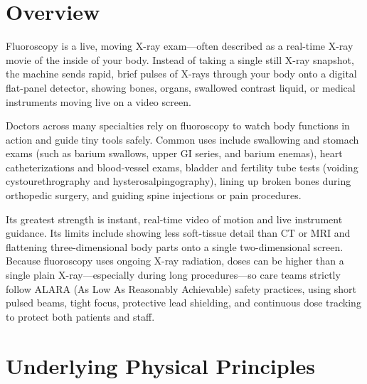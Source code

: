 \label{ch:infographic-fluroscopy}

\section{Overview}

Fluoroscopy is a live, moving X-ray exam---often described as a real-time X-ray movie of the inside of your body. Instead of taking a single still X-ray snapshot, the machine sends rapid, brief pulses of X-rays through your body onto a digital flat-panel detector, showing bones, organs, swallowed contrast liquid, or medical instruments moving live on a video screen.

Doctors across many specialties rely on fluoroscopy to watch body functions in action and guide tiny tools safely. Common uses include swallowing and stomach exams (such as barium swallows, upper GI series, and barium enemas), heart catheterizations and blood-vessel exams, bladder and fertility tube tests (voiding cystourethrography and hysterosalpingography), lining up broken bones during orthopedic surgery, and guiding spine injections or pain procedures.

Its greatest strength is instant, real-time video of motion and live instrument guidance. Its limits include showing less soft-tissue detail than CT or MRI and flattening three-dimensional body parts onto a single two-dimensional screen. Because fluoroscopy uses ongoing X-ray radiation, doses can be higher than a single plain X-ray---especially during long procedures---so care teams strictly follow ALARA (As Low As Reasonably Achievable) safety practices, using short pulsed beams, tight focus, protective lead shielding, and continuous dose tracking to protect both patients and staff.

\section{Underlying Physical Principles}

